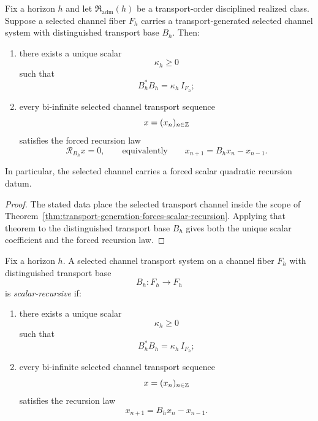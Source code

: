 \begin{corollary}
\label{cor:realized-transport-generation-forcing}
Fix a horizon $h$ and let $\mathfrak R_{\mathrm{adm}}(h)$ be a transport-order
disciplined realized class. Suppose a selected channel fiber $F_h$ carries a
transport-generated selected channel system with distinguished transport base
$B_h$. Then:
\begin{enumerate}[label=(\roman*), leftmargin=2em, itemsep=0.2em]
\item there exists a unique scalar
      \[
      \kappa_h\ge 0
      \]
      such that
      \[
      B_h^*B_h=\kappa_h\,I_{F_h};
      \]
\item every bi-infinite selected channel transport sequence
      \[
      x=(x_n)_{n\in\mathbb{Z}}
      \]
      satisfies the forced recursion law
      \[
      \mathcal R_{B_h}x=0,
      \qquad\text{equivalently}\qquad
      x_{n+1}=B_hx_n-x_{n-1}.
      \]
\end{enumerate}
In particular, the selected channel carries a forced scalar quadratic
recursion datum.
\end{corollary}

\begin{proof}
The stated data place the selected transport channel inside the scope of
Theorem~\ref{thm:transport-generation-forces-scalar-recursion}. Applying that
theorem to the distinguished transport base $B_h$ gives both the unique scalar
coefficient and the forced recursion law.
\end{proof}

\begin{definition}
\label{def:scalar-recursive-selected-channel-system}
Fix a horizon $h$. A selected channel transport system on a channel fiber
$F_h$ with distinguished transport base
\[
B_h:F_h\to F_h
\]
is \emph{scalar-recursive} if:
\begin{enumerate}[label=(\roman*), leftmargin=2em, itemsep=0.2em]
\item there exists a unique scalar
      \[
      \kappa_h\ge 0
      \]
      such that
      \[
      B_h^*B_h=\kappa_h\,I_{F_h};
      \]
\item every bi-infinite selected channel transport sequence
      \[
      x=(x_n)_{n\in\mathbb{Z}}
      \]
      satisfies the recursion law
      \[
      x_{n+1}=B_hx_n-x_{n-1}.
      \]
\end{enumerate}
\end{definition}

